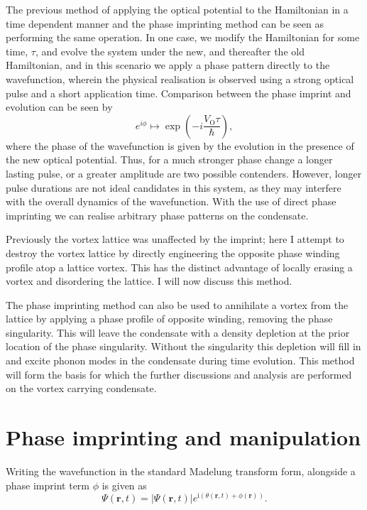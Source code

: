 The previous method of applying the optical potential to the Hamiltonian in a time dependent manner and the phase imprinting method can be seen as performing the same operation. In one case, we modify the Hamiltonian for some time, $\tau$, and evolve the system under the new, and thereafter the old Hamiltonian, and in this scenario we apply a phase pattern directly to the wavefunction, wherein the physical realisation is observed using a strong optical pulse and a short application time. Comparison between the phase imprint and evolution can be seen by
\begin{equation}
    e^{i\phi} \mapsto \exp\left(-i\frac{V_{\textrm{O}}\tau}{\hbar}\right),
\end{equation}
where the phase of the wavefunction is given by the evolution in the presence of the new optical potential. Thus, for a much stronger phase change a longer lasting pulse, or a greater amplitude are two possible contenders. However, longer pulse durations are not ideal candidates in this system, as they may interfere with the overall dynamics of the wavefunction. With the use of direct phase imprinting we can realise arbitrary phase patterns on the condensate.



Previously the vortex lattice was unaffected by the imprint; here I attempt to destroy the vortex lattice by directly engineering the opposite phase winding profile atop a lattice vortex. This has the distinct advantage of locally erasing a vortex and disordering the lattice. I will now discuss this method.



The phase imprinting method can also be used to annihilate a vortex from the lattice by applying a phase profile of opposite winding, removing the phase singularity.  This will leave the condensate with a density depletion at the prior location of the phase singularity. Without the singularity this depletion will fill in and excite phonon modes in the condensate during time evolution. This method will form the basis for which the further discussions and analysis are performed on the vortex carrying condensate.






\section{Phase imprinting and manipulation}
Writing the wavefunction in the standard Madelung transform form, alongside a phase imprint term $\phi$ is given as
\begin{equation}
    \Psi(\mathbf{r},t) = |\Psi(\mathbf{r},t)|e^{\text{i}(\theta(\mathbf{r},t) + \phi(\mathbf{r}))}.
\end{equation}



